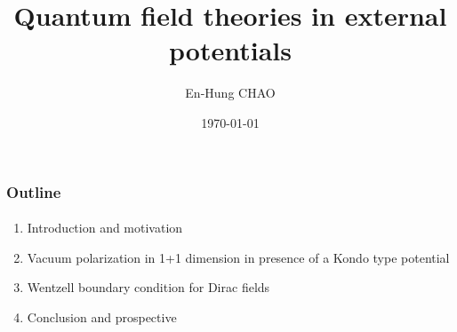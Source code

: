 \documentclass[french]{beamer}
\title{Quantum field theories in external potentials}
\author{En-Hung CHAO}
\institute{Ecole Polytechnique}
\date{\today}
\begin{document}

\begin{frame}
\titlepage%
\end{frame}
\begin{frame}
\frametitle{Outline}
\framesubtitle{}
\begin{enumerate}
 \item Introduction and motivation
 \item Vacuum polarization in 1+1 dimension in presence of a Kondo type potential
 \item Wentzell boundary condition for Dirac fields
 \item Conclusion and prospective
\end{enumerate}
\end{frame}
\end{document}
